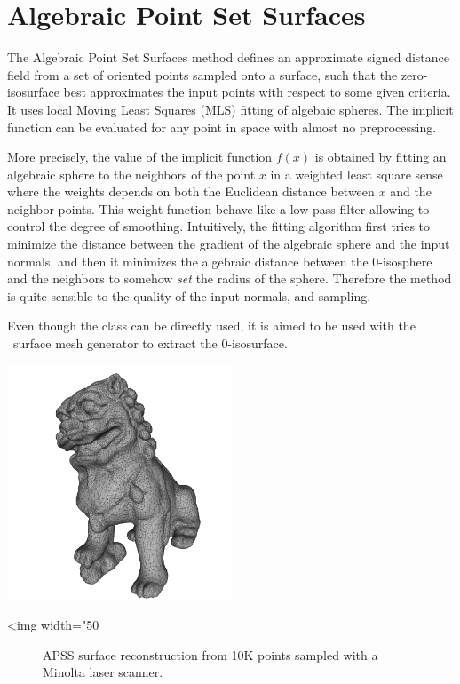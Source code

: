 
\section{Algebraic Point Set Surfaces}

The Algebraic Point Set Surfaces \cite{Guennebaud07} method defines an approximate signed distance field from a set of oriented points sampled onto a surface, such that the zero-isosurface best approximates the input points with respect to some given criteria.  It uses local Moving Least Squares (MLS) fitting of algebaic spheres. The implicit function can be evaluated for any point in space with almost no preprocessing.

More precisely, the value of the implicit function $f(x)$ is obtained by fitting an algebraic sphere to the neighbors of the point $x$ in a weighted least square sense where the weights depends on both the Euclidean distance between $x$ and the neighbor points. This weight function behave like a low pass filter allowing to control the degree of smoothing. Intuitively, the fitting algorithm first tries to minimize the distance between the gradient of the algebraic sphere and the input normals, and then it minimizes the algebraic distance between the 0-isosphere and the neighbors to somehow {\em set} the radius of the sphere. Therefore the method is quite sensible to the quality of the input normals, and sampling.

Even though the  class can be directly used, it is aimed to be used with the \cgal\ surface mesh generator to extract the $0$-isosurface.


\begin{center}
    \label{Surface_reconstruction_points_3-fig-APSS}
    \begin{ccTexOnly}
        \includegraphics[width=0.5\textwidth]{Surface_reconstruction_points_3/APSS} %
    \end{ccTexOnly}
    \begin{ccHtmlOnly}
        <img width="50%
    \end{ccHtmlOnly}
    \begin{figure}[h]
        \caption{APSS surface reconstruction from 10K
                 points sampled with a Minolta laser scanner.}
    \end{figure}
\end{center}

